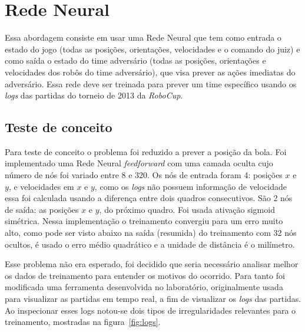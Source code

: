 \section{Rede Neural}\label{cap:abordagem_rede_neural}

Essa abordagem consiste em usar uma Rede Neural que tem como entrada o estado do
jogo (todas as posições, orientações, velocidades e o comando do juiz) e como
saída o estado do time adversário (todas as posições, orientações e velocidades
dos robôs do time adversário), que visa prever as ações imediatas do adversário.
Essa rede deve ser treinada para prever um time específico usando os
\textit{logs} das partidas do torneio de 2013 da \textit{RoboCup}.

\subsection{Teste de conceito}


Para teste de conceito o problema foi reduzido a prever a posição da bola. Foi
implementado uma Rede Neural \textit{feedforward} com uma camada oculta cujo
número de nós foi variado entre 8 e 320. Os nós de entrada foram 4: posições $x$
e $y$, e velocidades em $x$ e $y$, como os \textit{logs} não possuem informação
de velocidade essa foi calculada usando a diferença entre dois quadros
consecutivos. São 2 nós de saída: as posições $x$ e $y$, do próximo quadro. Foi
usada ativação sigmoid simétrica. Nessa implementação o treinamento convergiu
para um erro muito alto, como pode ser visto abaixo na saída (resumida) do
treinamento com 32 nós ocultos, é usado o erro médio quadrático e a unidade de
distância é o milímetro.



Esse problema não era esperado, foi decidido que seria necessário analisar
melhor os dados de treinamento para entender os motivos do ocorrido. Para tanto
foi modificada uma ferramenta desenvolvida no laboratório, originalmente usada
para visualizar as partidas em tempo real, a fim de visualizar os \textit{logs}
das partidas. Ao inspecionar esses logs notou-se dois tipos de irregularidades
relevantes para o treinamento, mostradas na figura~\ref{fig:logs}.


